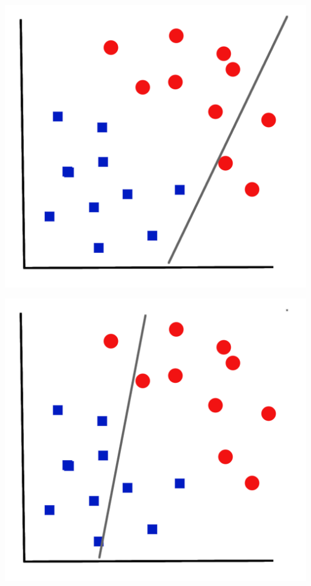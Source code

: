 \documentclass[aspectratio=169,xcolor=dvipsnames]{beamer}
\begin{document}
\begin{frame}
\begin{center}
\includegraphics[height=0.8\paperheight,keepaspectratio]{images/coordinates_points_1} 
\end{center}
\end{frame}

\begin{frame}
\begin{center}
\includegraphics[height=0.8\paperheight,keepaspectratio]{images/coordinates_points_2} 
\end{center}
\end{frame}
\end{document}
